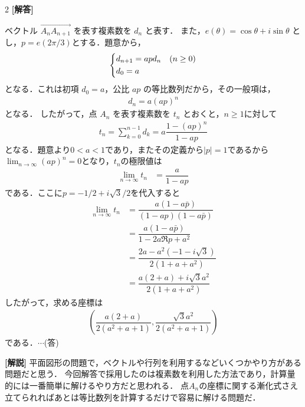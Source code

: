\documentclass[../../main.tex]{subfiles}
\begin{document}
\setcounter{equation}{0}
\setcounter{figure}{0}
\setcounter{table}{0}
\begin{oframed}
  
\end{oframed}
\setlength{\columnseprule}{0.4pt}
\begin{multicols}{2}
  {\bf [解答]}

  ベクトル $\overrightarrow{A_n A_{n+1}}$ を表す複素数を $d_n$ と表す．
  また，$e(\theta) = \cos\theta + i\sin\theta$ とし，$p=e(2\pi/3)$とする．題意から，
  \begin{align}
    \begin{dcases}
      d_{n+1} = a p d_n & (n \ge 0) \\
      d_0 = a           &
    \end{dcases}
  \end{align}
  となる．これは初項 $d_0 = a$，公比 $ap$ の等比数列だから，その一般項は，
  \begin{align}
    d_n = a(ap)^n
  \end{align}
  となる．
  したがって，点 $A_n$ を表す複素数を $t_n$ とおくと，$n\ge 1$に対して
  \begin{align}
    t_n = \sum_{k=0}^{n-1} d_k = a \dfrac{1-(ap)^n}{1-ap}
  \end{align}
  となる．題意より$0<a<1$であり，またその定義から$|p|=1$であるから
  $\lim_{n \to \infty} (ap)^n = 0$となり，$t_n$の極限値は
  \begin{align}
    \lim_{n \to \infty} t_n & = \dfrac{a}{1-ap}
  \end{align}
  である．ここに$p=-1/2+i\sqrt{3}/2$を代入すると
  \begin{align}
    \lim_{n \to \infty} t_n
    & = \dfrac{a(1-a\bar{p})}{(1-ap)(1-a\bar{p})}  \\
    & = \dfrac{a(1-a\bar{p})}{1-2a\Re p + a^2}     \\
    & = \dfrac{2a-a^2(-1-i\sqrt{3})}{2(1+a + a^2)} \\
    & = \dfrac{a(2+a)+i\sqrt{3}a^2}{2(1+a + a^2)}
  \end{align}
  したがって，求める座標は
  \begin{align}
    \left( \dfrac{a(2+a)}{2(a^2+a+1)}, \dfrac{\sqrt{3}a^2}{2(a^2+a+1)} \right)
  \end{align}
  である．$\cdots$(答)

  {\bf [解説]}
  平面図形の問題で，ベクトルや行列を利用するなどいくつかやり方がある問題だと思う．
  今回解答で採用したのは複素数を利用した方法であり，計算量的には一番簡単に解けるやり方だと思われる．
  点$A_n$の座標に関する漸化式さえ立てられればあとは等比数列を計算するだけで容易に解ける問題だ．


\end{multicols}
\end{document}
